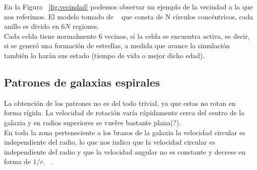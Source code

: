 \documentclass[12tp]{article}
\begin{document}
En la Figura ~\ref{fig:vecindad} podemos observar un ejemplo de la vecindad a la que nos referimos.
El modelo tomado de ~\cite{Schulman} que consta de N círculos concéntricos, cada anillo es divido en $6N$ regiones.\\
Cada celda tiene normalmente 6 vecinos, si la celda se encuentra activa, es decir, si se generó una formación de estrellas,
a medida que avance la simulación también lo harán sus estado (tiempo de vida o mejor dicho edad).\\[0.2cm]

\subsection{Patrones de galaxias espirales}
La obtención de los patrones no es  del todo trivial, ya que estas no rotan en forma rígida.
La velocidad de rotación varía rápidamente cerca del centro de la galaxia y en radios superiores se vuelve bastante 
plana(?).\\[0.2cm] En toda la zona perteneciente a los brazos de la galaxia la velocidad circular es independiente del radio, lo que nos indica 
que la velocidad circular es independiente del radio y que la velocidad angular no es constante y decrese en forma de $1/r$.
~\cite{Schulman}.
  
\end{document}
